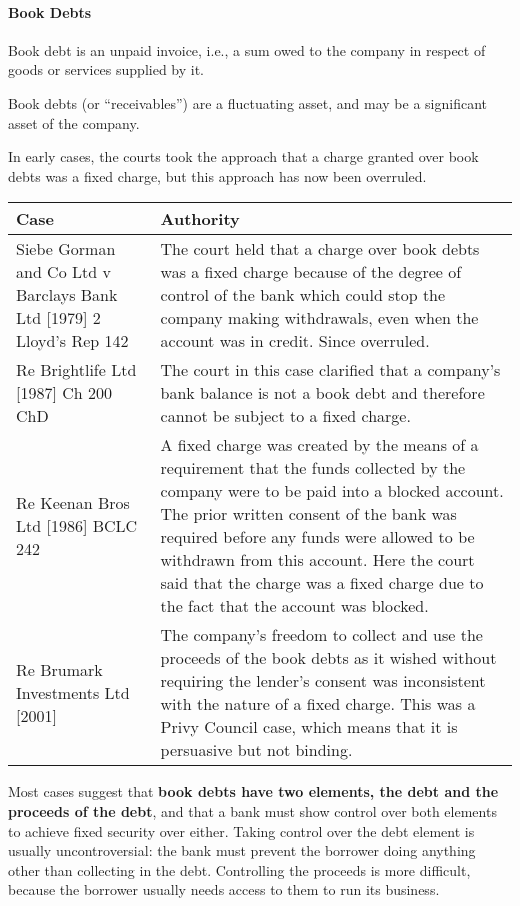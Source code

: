 \documentclass[
]{article}
\begin{document}
\hypertarget{book-debts}{%
\paragraph{Book Debts}\label{book-debts}}

Book debt is an unpaid invoice, i.e., a sum owed to the company in
respect of goods or services supplied by it.

Book debts (or ``receivables'') are a fluctuating asset, and may be a
significant asset of the company.

In early cases, the courts took the approach that a charge granted over
book debts was a fixed charge, but this approach has now been overruled.

\begin{longtable}[]{@{}ll@{}}
\toprule()
Case & Authority \\
\midrule()
\endhead
Siebe Gorman and Co Ltd v Barclays Bank Ltd {[}1979{]} 2 Lloyd's Rep 142
& The court held that a charge over book debts was a fixed charge
because of the degree of control of the bank which could stop the
company making withdrawals, even when the account was in credit. Since
overruled. \\
Re Brightlife Ltd {[}1987{]} Ch 200 ChD & The court in this case
clarified that a company's bank balance is not a book debt and therefore
cannot be subject to a fixed charge. \\
Re Keenan Bros Ltd {[}1986{]} BCLC 242 & A fixed charge was created by
the means of a requirement that the funds collected by the company were
to be paid into a blocked account. The prior written consent of the bank
was required before any funds were allowed to be withdrawn from this
account. Here the court said that the charge was a fixed charge due to
the fact that the account was blocked. \\
Re Brumark Investments Ltd {[}2001{]} & The company's freedom to collect
and use the proceeds of the book debts as it wished without requiring
the lender's consent was inconsistent with the nature of a fixed charge.
This was a Privy Council case, which means that it is persuasive but not
binding. \\
\bottomrule()
\end{longtable}

Most cases suggest that \textbf{book debts have two elements, the debt
and the proceeds of the debt}, and that a bank must show control over
both elements to achieve fixed security over either. Taking control over
the debt element is usually uncontroversial: the bank must prevent the
borrower doing anything other than collecting in the debt. Controlling
the proceeds is more difficult, because the borrower usually needs
access to them to run its business.
\end{document}
